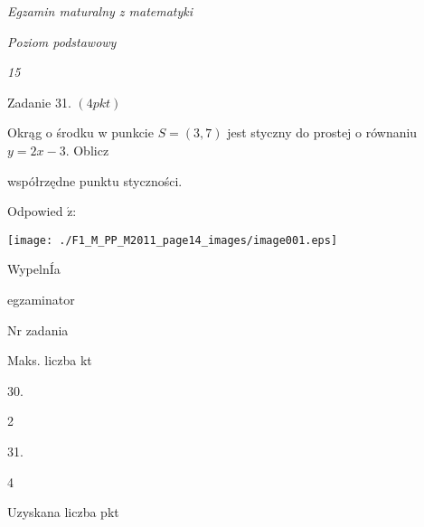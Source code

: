 \documentclass[a4paper,12pt]{article}
\begin{document}
{\it Egzamin maturalny z matematyki}

{\it Poziom podstawowy}

{\it 15}

Zadanie 31. $(4pkt)$

Okrąg o środku w punkcie $S=(3,7)$ jest styczny do prostej o równaniu $y=2x-3$. Oblicz

współrzędne punktu styczności.

Odpowied $\acute{\mathrm{z}}$:
\begin{center}
\texttt{[image: ./F1\_M\_PP\_M2011\_page14\_images/image001.eps]}
\end{center}
WypelnÍa

egzaminator

Nr zadania

Maks. liczba kt

30.

2

31.

4

Uzyskana liczba pkt
\end{document}
